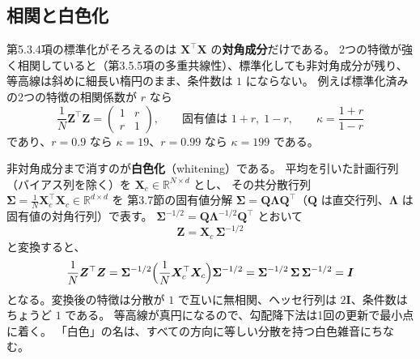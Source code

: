 \subsection{相関と白色化}
\label{sec:app-whitening}


第5.3.4項の標準化がそろえるのは $\bm{X}^\top\bm{X}$ の\textbf{対角成分}だけである。
2つの特徴が強く相関していると（第3.5.5項の多重共線性）、標準化しても非対角成分が残り、
等高線は斜めに細長い楕円のまま、条件数は $1$ にならない。
例えば標準化済みの2つの特徴の相関係数が $r$ なら
\begin{equation*}
  \frac{1}{N}\bm{Z}^\top\bm{Z} = \begin{pmatrix} 1 & r \\ r & 1 \end{pmatrix}, \qquad
  \text{固有値は } 1 + r,\; 1 - r, \qquad \kappa = \frac{1 + r}{1 - r}
\end{equation*}
であり、$r = 0.9$ なら $\kappa = 19$、$r = 0.99$ なら $\kappa = 199$ である。

非対角成分まで消すのが\textbf{白色化}（whitening）である。
平均を引いた計画行列（バイアス列を除く）を $\bm{X}_c \in \mathbb{R}^{N \times d}$ とし、
その共分散行列 $\bm{\Sigma} = \frac{1}{N}\bm{X}_c^\top\bm{X}_c \in \mathbb{R}^{d \times d}$ を
第3.7節の固有値分解 $\bm{\Sigma} = \bm{Q}\bm{\Lambda}\bm{Q}^\top$（$\bm{Q}$ は直交行列、$\bm{\Lambda}$ は固有値の対角行列）で表す。
$\bm{\Sigma}^{-1/2} = \bm{Q}\bm{\Lambda}^{-1/2}\bm{Q}^\top$ とおいて
\begin{equation}
  \bm{Z} = \bm{X}_c\,\bm{\Sigma}^{-1/2}
  \label{eq:whitening}
\end{equation}
と変換すると、
\begin{equation*}
  \frac{1}{N}\bm{Z}^\top\bm{Z}
  = \bm{\Sigma}^{-1/2}\Bigl(\frac{1}{N}\bm{X}_c^\top\bm{X}_c\Bigr)\bm{\Sigma}^{-1/2}
  = \bm{\Sigma}^{-1/2}\,\bm{\Sigma}\,\bm{\Sigma}^{-1/2} = \bm{I}
\end{equation*}
となる。変換後の特徴は分散が $1$ で互いに無相関、ヘッセ行列は $2\bm{I}$、条件数はちょうど $1$ である。
等高線が真円になるので、勾配降下法は1回の更新で最小点に着く。
「白色」の名は、すべての方向に等しい分散を持つ白色雑音にちなむ。

